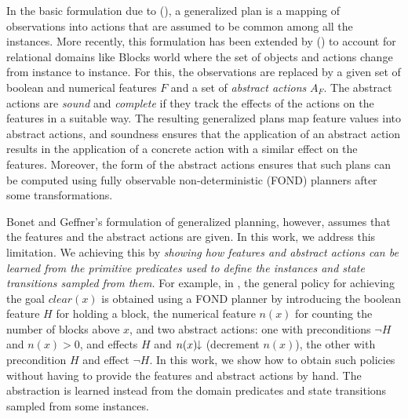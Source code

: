 \documentclass[letterpaper]{article} %
\newcommand{\Omit}[1]{}
\newcommand{\citeay}[1]{\citeauthor{#1} (\citeyear{#1})}
\newcommand{\mminus}{\hspace{-.05em}\raisebox{.15ex}{\footnotesize$\downarrow$}}
\begin{document}
In the basic formulation due  to \citeay{hu:generalized}, a generalized plan
is a mapping of observations into actions that are assumed to be common
among  all the instances. More recently, this formulation has been extended by
\citeay{bonet:ijcai2018} to account for relational domains like Blocks world  where the set of
objects and  actions change from instance to instance.
For this,   the observations  are replaced by  a given  set of boolean
and numerical features $F$ and a set of \emph{abstract actions} $A_F$.
The  abstract actions are  \emph{sound} and \emph{complete} if they track the
effects  of the actions on  the features in a suitable way.
The resulting generalized plans  map feature values into abstract actions, and soundness
ensures that the application  of an   abstract action  results in the application of
a concrete action with a similar  effect  on  the features. Moreover, the form of the abstract actions
ensures that such plans can be computed using fully observable non-deterministic (FOND) planners
after some transformations.

\Omit{
Abstract actions can increase or decrease numerical variables  $n$
associated with the numerical features (e.g., number of blocks above $x$), and while
increments  are transformed into deterministic propositional  effects $n > 0$ where $n > 0$ is
the negation of the proposition $n=0$, decrements  are  transformed  into
non-deterministic (disjunctive)  propositional effects $n > 0 \, | \, n=0$. 
}

Bonet and Geffner's  formulation of generalized planning, however, assumes that the
features and the abstract actions are given.   In this work, we address this limitation.
We achieving this by  \emph{showing  how features and abstract actions  can be learned from
the primitive predicates used to define the instances and state transitions
sampled from them.} For example,  in \cite{bonet:ijcai2018}, 
the general policy for achieving the goal $clear(x)$  is obtained 
using a FOND planner by introducing the boolean feature $H$ for holding a block,
the numerical feature $n(x)$ for counting the  number of blocks above $x$, and  two   abstract  actions:
one  with  preconditions  $\neg H$ and $n(x) > 0$, and effects $H$ and $n(x)\mminus$
(decrement $n(x)$), the other with precondition $H$ and effect $\neg H$.
In this work, we show how  to obtain such  policies without
having to provide the  features and  abstract actions by hand.
The abstraction is learned instead from the domain predicates
and  state transitions sampled from some  instances. 
\end{document}
